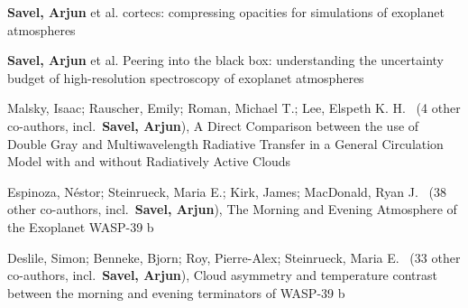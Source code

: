 


\item[{\color{numcolor}\scriptsize5}] \textbf{Savel, Arjun} et al. cortecs: compressing opacities for simulations of exoplanet atmospheres
\item[{\color{numcolor}\scriptsize4}] \textbf{Savel, Arjun} et al. Peering into the black box: understanding the uncertainty budget of high-resolution spectroscopy of exoplanet atmospheres
\item[{\color{numcolor}\scriptsize3}] Malsky, Isaac; Rauscher, Emily; Roman, Michael T.; Lee, Elspeth K. H. \etal\ ({4} other co-authors, incl.\ \textbf{Savel, Arjun}), A Direct Comparison between the use of Double Gray and Multiwavelength Radiative Transfer in a General Circulation Model with and without Radiatively Active Clouds
\item[{\color{numcolor}\scriptsize2}] Espinoza, Néstor; Steinrueck, Maria E.; Kirk, James; MacDonald, Ryan J. \etal\ ({38} other co-authors, incl.\ \textbf{Savel, Arjun}), The Morning and Evening Atmosphere of the
Exoplanet WASP-39 b
\item[{\color{numcolor}\scriptsize1}] Deslile, Simon; Benneke, Bjorn; Roy, Pierre-Alex; Steinrueck, Maria E. \etal\ ({33} other co-authors, incl.\ \textbf{Savel, Arjun}), Cloud asymmetry and temperature contrast between the morning and evening terminators of WASP-39 b
